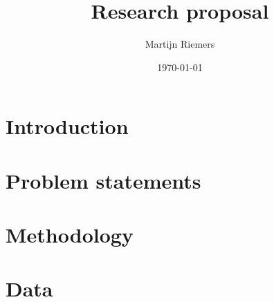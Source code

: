 \documentclass[a4paper,11pt]{article}
\title{Research proposal}
\author{Martijn Riemers}
\date{\today}
\begin{document}
\maketitle

%

%


\section{Introduction}


\section{Problem statements}


\section{Methodology}


\section{Data}


%

\printbibliography
\end{document}

